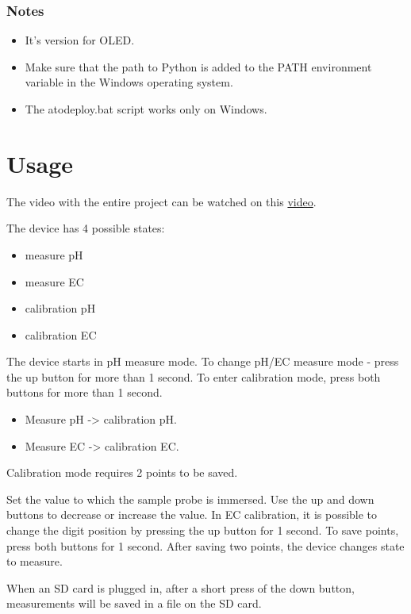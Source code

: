 \documentclass{article}
\begin{document}
\subsubsection{Notes}
\begin{itemize}
    \item It's version for OLED.
    \item Make sure that the path to Python is added to the PATH environment variable in the Windows operating system.
    \item The atodeploy.bat script works only on Windows.
\end{itemize}

\section{Usage}
The video with the entire project can be watched on this \href{https://youtu.be/vjk0nq04lCo}{video}.

The device has 4 possible states:
\begin{itemize}
    \item measure pH
    \item measure EC
    \item calibration pH
    \item calibration EC
\end{itemize}

The device starts in pH measure mode. To change pH/EC measure mode - press the up button for more than 1 second. To enter calibration mode, press both buttons for more than 1 second. 
\begin{itemize}
    \item Measure pH -> calibration pH.
    \item Measure EC -> calibration EC.
\end{itemize}
Calibration mode requires 2 points to be saved.

Set the value to which the sample probe is immersed. Use the up and down buttons to decrease or increase the value. In EC calibration, it is possible to change the digit position by pressing the up button for 1 second. To save points, press both buttons for 1 second. After saving two points, the device changes state to measure.

When an SD card is plugged in, after a short press of the down button, measurements will be saved in a file on the SD card.
\end{document}
